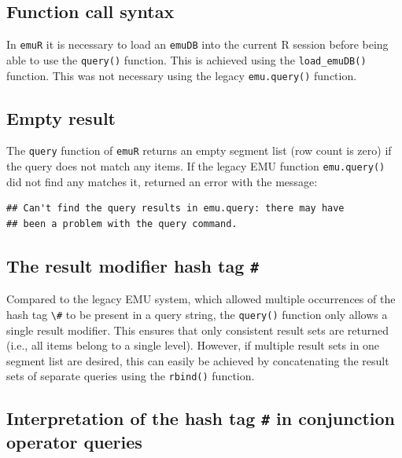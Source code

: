 \documentclass[]{book}
\begin{document}
\hypertarget{function-call-syntax}{%
\subsection{Function call syntax}\label{function-call-syntax}}

In \texttt{emuR} it is necessary to load an \texttt{emuDB} into the current R session before being able to use the \texttt{query()} function. This is achieved using the \texttt{load\_emuDB()} function. This was not necessary using the legacy \texttt{emu.query()} function.

\hypertarget{empty-result}{%
\subsection{Empty result}\label{empty-result}}

The \texttt{query} function of \texttt{emuR} returns an empty segment list (row count is zero) if the query does not match any items. If the legacy EMU function \texttt{emu.query()} did not find any matches it, returned an error with the message:

\begin{verbatim}
## Can't find the query results in emu.query: there may have 
## been a problem with the query command.
\end{verbatim}

\hypertarget{the-result-modifier-hash-tag}{%
\subsection{\texorpdfstring{The result modifier hash tag \texttt{\#}}{The result modifier hash tag \#}}\label{the-result-modifier-hash-tag}}

Compared to the legacy EMU system, which allowed multiple occurrences of the hash tag \texttt{\textbackslash{}\#} to be present in a query string, the \texttt{query()} function only allows a single result modifier. This ensures that only consistent result sets are returned (i.e., all items belong to a single level). However, if multiple result sets in one segment list are desired, this can easily be achieved by concatenating the result sets of separate queries using the \texttt{rbind()} function.

\hypertarget{interpretation-of-the-hash-tag-in-conjunction-operator-queries}{%
\subsection{\texorpdfstring{Interpretation of the hash tag \texttt{\#} in conjunction operator queries}{Interpretation of the hash tag \# in conjunction operator queries}}\label{interpretation-of-the-hash-tag-in-conjunction-operator-queries}}
\end{document}
